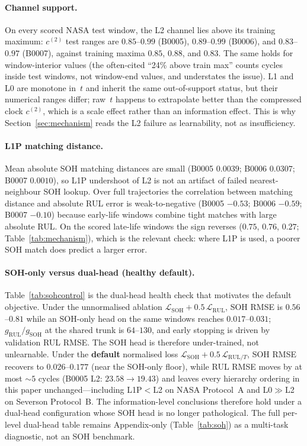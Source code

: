 \documentclass[preprint,12pt]{elsarticle}
\begin{document}
\paragraph{Channel support.}
On every scored NASA test window, the L2 channel lies above its training maximum: $c^{(2)}$ test ranges are $0.85$--$0.99$ (B0005), $0.89$--$0.99$ (B0006), and $0.83$--$0.97$ (B0007), against training maxima $0.85$, $0.88$, and $0.83$.
The same holds for window-interior values (the often-cited “24\% above train max” counts cycles inside test windows, not window-end values, and understates the issue).
L1 and L0 are monotone in~$t$ and inherit the same out-of-support status, but their numerical ranges differ; raw~$t$ happens to extrapolate better than the compressed clock $c^{(2)}$, which is a scale effect rather than an information effect.
This is why Section~\ref{sec:mechanism} reads the L2 failure as learnability, not as insufficiency.

\paragraph{L1P matching distance.}
Mean absolute SOH matching distances are small (B0005 $0.0039$; B0006 $0.0307$; B0007 $0.0010$), so L1P undershoot of L2 is not an artifact of failed nearest-neighbour SOH lookup.
Over full trajectories the correlation between matching distance and absolute RUL error is weak-to-negative (B0005 $-0.53$; B0006 $-0.59$; B0007 $-0.10$) because early-life windows combine tight matches with large absolute RUL.
On the scored late-life windows the sign reverses ($0.75$, $0.76$, $0.27$; Table~\ref{tab:mechanism}), which is the relevant check: where L1P is used, a poorer SOH match does predict a larger error.

\paragraph{SOH-only versus dual-head (healthy default).}
Table~\ref{tab:sohcontrol} is the dual-head health check that motivates the default objective.
Under the unnormalised ablation $\mathcal{L}_{\mathrm{SOH}}+0.5\,\mathcal{L}_{\mathrm{RUL}}$, SOH RMSE is $0.56$--$0.81$ while an SOH-only head on the same windows reaches $0.017$--$0.031$; $g_{\mathrm{RUL}}/g_{\mathrm{SOH}}$ at the shared trunk is $64$--$130$, and early stopping is driven by validation RUL RMSE.
The SOH head is therefore under-trained, not unlearnable.
Under the \textbf{default} normalised loss $\mathcal{L}_{\mathrm{SOH}}+0.5\,\mathcal{L}_{\mathrm{RUL}/T}$, SOH RMSE recovers to $0.026$--$0.177$ (near the SOH-only floor), while RUL RMSE moves by at most $\sim 5$ cycles (B0005 L2: $23.58\to 19.43$) and leaves every hierarchy ordering in this paper unchanged---including L1P$<$L2 on NASA Protocol~A and L0$\gg$L2 on Severson Protocol~B.
The information-level conclusions therefore hold under a dual-head configuration whose SOH head is no longer pathological.
The full per-level dual-head table remains Appendix-only (Table~\ref{tab:soh}) as a multi-task diagnostic, not an SOH benchmark.
\end{document}
